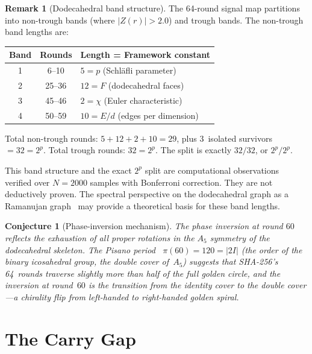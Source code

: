 \documentclass[12pt, a4paper]{article}
\theoremstyle{plain}
\newtheorem{conjecture}[theorem]{Conjecture}
\theoremstyle{definition}
\newtheorem{remark}[theorem]{Remark}
\begin{document}
\begin{remark}[Dodecahedral band structure]
The 64-round signal map partitions into non-trough bands (where
$|Z(r)|>2.0$) and trough bands.
The non-trough band lengths are:

\begin{center}
\begin{tabular}{ccl}
\toprule
Band & Rounds & Length = Framework constant\\
\midrule
1 & 6--10 & $5 = p$ (Schl\"afli parameter)\\
2 & 25--36 & $12 = F$ (dodecahedral faces)\\
3 & 45--46 & $2 = \chi$ (Euler characteristic)\\
4 & 50--59 & $10 = E/d$ (edges per dimension)\\
\bottomrule
\end{tabular}
\end{center}

Total non-trough rounds: $5+12+2+10=29$, plus 3~isolated
survivors${}= 32 = 2^{p}$.
Total trough rounds: $32 = 2^{p}$.
The split is exactly $32/32$, or $2^{p}/2^{p}$.

This band structure and the exact $2^{p}$ split are computational
observations verified over $N=2000$ samples with Bonferroni
correction.
They are not deductively proven.
The spectral perspective on the dodecahedral graph as a Ramanujan
graph~\cite{ramanujan-graphs} may provide a theoretical basis for
these band lengths.
\end{remark}

\begin{conjecture}[Phase-inversion mechanism]\label{conj:phase}
The phase inversion at round $60$ reflects the exhaustion of all
proper rotations in the $A_{5}$ symmetry of the dodecahedral
skeleton.
The Pisano period~\cite{pisano} $\pi(60)=120=|2I|$ (the order of the binary
icosahedral group, the double cover of~$A_{5}$) suggests that
SHA-256's 64~rounds traverse slightly more than half of the full
golden circle, and the inversion at round~$60$ is the transition
from the identity cover to the double cover---a chirality flip
from left-handed to right-handed golden spiral.
\end{conjecture}

\section{The Carry Gap}\label{sec:carry-gap}
\end{document}
